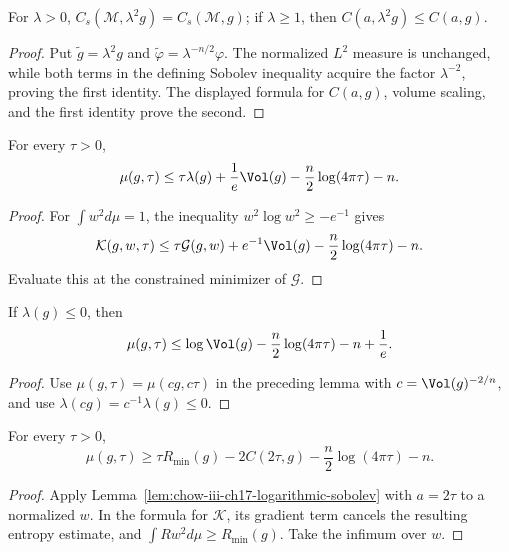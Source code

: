 \begin{lemma}
\label{lem:chow-iii-ch17-sobolev-scaling}
For $\lambda>0$,
$C_s(\mathcal M,\lambda^2g)=C_s(\mathcal M,g)$; if $\lambda\ge1$, then
$C(a,\lambda^2g)\le C(a,g)$.
\end{lemma}
\begin{proof}
\sketch Put $\widetilde g=\lambda^2g$ and
$\widetilde\varphi=\lambda^{-n/2}\varphi$.  The normalized $L^2$ measure is
unchanged, while both terms in the defining Sobolev inequality acquire the
factor $\lambda^{-2}$, proving the first identity.  The displayed formula
for $C(a,g)$, volume scaling, and the first identity prove the second.
\end{proof}

\begin{lemma}
\label{lem:chow-iii-ch17-mu-upper-lambda-volume}
For every $\tau>0$,
\[
 \mu(g,\tau)\le\tau\lambda(g)+\frac1e\Vol(g)
 -\frac n2\log(4\pi\tau)-n.
\]
\end{lemma}
\begin{proof}
\sketch For $\int w^2d\mu=1$, the inequality
$w^2\log w^2\ge-e^{-1}$ gives
\[
 \mathcal K(g,w,\tau)\le \tau\mathcal G(g,w)+e^{-1}\Vol(g)
 -\frac n2\log(4\pi\tau)-n.
\]
Evaluate this at the constrained minimizer of $\mathcal G$.
\end{proof}

\begin{corollary}
\label{cor:chow-iii-ch17-mu-upper-nonpositive-lambda}
If $\lambda(g)\le0$, then
\[
 \mu(g,\tau)\le\log\Vol(g)-\frac n2\log(4\pi\tau)-n+\frac1e.
\]
\end{corollary}
\begin{proof}
\sketch Use $\mu(g,\tau)=\mu(cg,c\tau)$ in the preceding lemma with
$c=\Vol(g)^{-2/n}$, and use $\lambda(cg)=c^{-1}\lambda(g)\le0$.
\end{proof}

\begin{lemma}
\label{lem:chow-iii-ch17-mu-lower-log-sobolev}
For every $\tau>0$,
\[
 \mu(g,\tau)\ge \tau R_{\min}(g)-2C(2\tau,g)
 -\frac n2\log(4\pi\tau)-n.
\]
\end{lemma}
\begin{proof}
\sketch Apply Lemma~\ref{lem:chow-iii-ch17-logarithmic-sobolev} with $a=2\tau$
to a normalized $w$.  In the formula for $\mathcal K$, its gradient term
cancels the resulting entropy estimate, and
$\int Rw^2d\mu\ge R_{\min}(g)$.  Take the infimum over $w$.
\end{proof}

